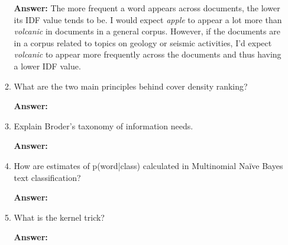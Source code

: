 \documentclass[11pt]{article}
\begin{document}
\begin{enumerate}
\begin{enumerate}
                \textbf{Answer:} The more frequent a word appears across documents, the lower its IDF value tends to be. I would expect \textit{apple} to appear a lot more than \textit{volcanic} in documents in a general corpus. However, if the documents are in a corpus related to topics on geology or seismic activities, I'd expect \textit{volcanic} to appear more frequently across the documents and thus having a lower IDF value.

          \item What are the two main principles behind cover density ranking?

                \textbf{Answer:}

          \item Explain Broder's taxonomy of information needs.

                \textbf{Answer:}

          \item How are estimates of p(word|class) calculated in Multinomial Naïve Bayes text classification?

                \textbf{Answer:}

          \item What is the kernel trick?

                \textbf{Answer:}

        \end{enumerate}

\end{enumerate}
\end{document}
